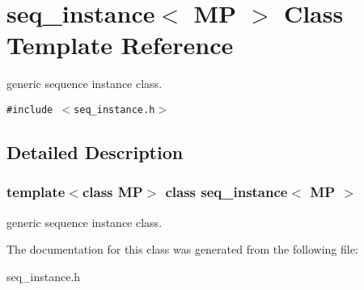 \section{seq\_\-instance$<$ MP $>$ Class Template Reference}
\label{classseq__instance}
generic sequence instance class.  


{\tt \#include $<$seq\_\-instance.h$>$}



\subsection{Detailed Description}
\subsubsection*{template$<$class MP$>$ class seq\_\-instance$<$ MP $>$}

generic sequence instance class. 



The documentation for this class was generated from the following file:\begin{CompactItemize}
\item 
seq\_\-instance.h\end{CompactItemize}
